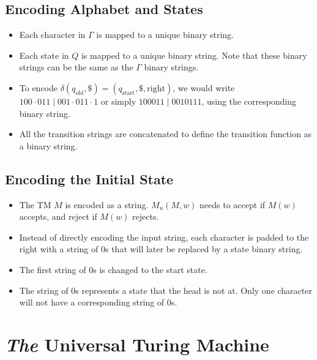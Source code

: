 \documentclass[12pt]{article}
\begin{document}
\subsection{Encoding Alphabet and States}
\begin{itemize}
    \item Each character in $\Gamma$ is mapped to a unique binary string.
    \item Each state in $Q$ is mapped to a unique binary string. Note that these binary strings can be the same as the $\Gamma$ binary strings.
    \item To encode $\delta(q_\text{old}, \$) = (q_\text{start}, \$, \text{right})$, we would write $100 \cdot 011 \mid 001 \cdot 011 \cdot 1$ or simply $100011 \mid 0010111$, using the corresponding binary string.
    \item All the transition strings are concatenated to define the transition function as a binary string.
\end{itemize}

\subsection{Encoding the Initial State}
\begin{itemize}
    \item The TM $M$ is encoded as a string. $M_u(M, w)$ needs to accept if $M(w)$ accepts, and reject if $M(w)$ rejects.
    \item Instead of directly encoding the input string, each character is padded to the right with a string of $0$s that will later be replaced by a state binary string.
    \item The first string of $0$s is changed to the start state.
    \item The string of $0$s represents a state that the head is not at. Only one character will not have a corresponding string of $0$s.
\end{itemize}

\section{\textit{The} Universal Turing Machine}
\end{document}
